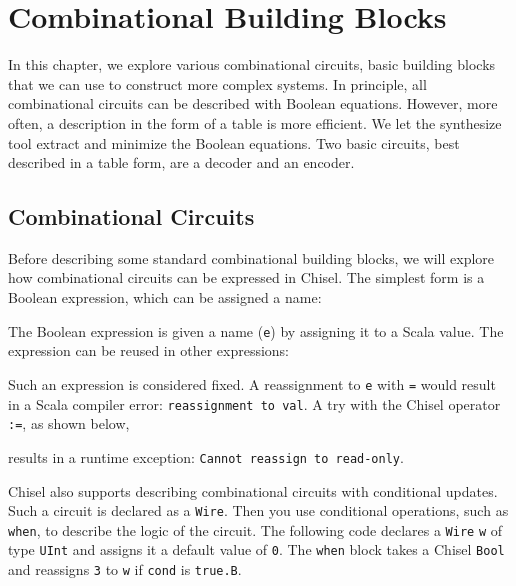\documentclass[%
    10pt,
    headinclude, footexclude,
    openright, %
    notitlepage,
    cleardoubleempty,
    headsepline,
    pointlessnumbers,
    bibtotoc, idxtotoc,
    ]{scrbook}
\newcommand{\code}[1]{{\lstinline[basicstyle=\small\ttfamily]{#1}}}
\begin{document}
\chapter{Combinational Building Blocks}
\label{chap:comb}

In this chapter, we explore various combinational circuits, basic building blocks that we can
use to construct more complex systems.
In principle, all combinational circuits can be described with Boolean equations.
However, more often, a description in the form of a table is more efficient.
We let the synthesize tool extract and minimize the Boolean equations.
Two basic circuits, best described in a table form, are a decoder and an encoder.

\section{Combinational Circuits}


Before describing some standard combinational building blocks, we will explore
how combinational circuits can be expressed in Chisel.
The simplest form is a Boolean expression, which can be assigned a name:


\noindent The Boolean expression is given a name (\code{e}) by assigning it
to a Scala value. The expression can be reused in other expressions:


Such an expression is considered fixed. A reassignment to \code{e}
with \code{=} would result in a Scala compiler error: \code{reassignment to val}.
A try with the Chisel operator \code{:=}, as shown below,


\noindent results in a runtime exception: \code{Cannot reassign to read-only}.

Chisel also supports describing combinational circuits with conditional updates.
Such a circuit is declared as a \code{Wire}. Then you use conditional operations,
such as \code{when}, to describe the logic of the circuit.
The following code declares a \code{Wire} \code{w} of type \code{UInt} and assigns it a default
value of \code{0}. The \code{when} block takes a Chisel \code{Bool} and reassigns
\code{3} to \code{w} if \code{cond} is \code{true.B}.

\end{document}
